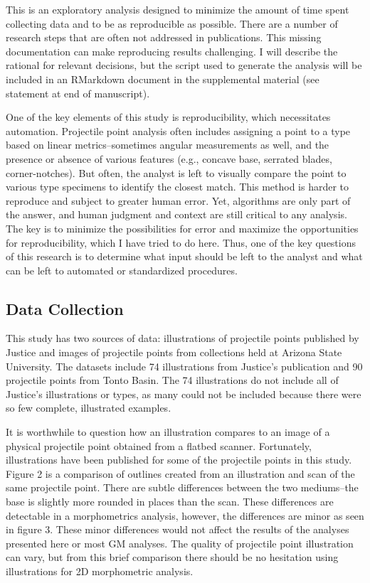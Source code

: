 \documentclass[a4paper]{article}
\begin{document}
This is an exploratory analysis designed to minimize the amount of time spent collecting data and to be as reproducible as possible. There are a number of research steps that are often not addressed in publications. This missing documentation can make reproducing results challenging. I will describe the rational for relevant decisions, but the script used to generate the analysis will be included in an RMarkdown document in the supplemental material (see statement at end of manuscript).

One of the key elements of this study is reproducibility, which necessitates automation. Projectile point analysis often includes assigning a point to a type based on linear metrics--sometimes angular measurements as well, and the presence or absence of various features (e.g., concave base, serrated blades, corner-notches). But often, the analyst is left to visually compare the point to various type specimens to identify the closest match. This method is harder to reproduce and subject to greater human error. Yet, algorithms are only part of the answer, and human judgment and context are still critical to any analysis. The key is to minimize the possibilities for error and maximize the opportunities for reproducibility, which I have tried to do here. Thus, one of the key questions of this research is to determine what input should be left to the analyst and what can be left to automated or standardized procedures.

\hypertarget{data-collection}{%
\subsection*{Data Collection}\label{data-collection}}

This study has two sources of data: illustrations of projectile points published by Justice \autocite*{Justice2002-cf} and images of projectile points from collections held at Arizona State University. The datasets include 74 illustrations from Justice's publication and 90 projectile points from Tonto Basin. The 74 illustrations do not include all of Justice's illustrations or types, as many could not be included because there were so few complete, illustrated examples.

It is worthwhile to question how an illustration compares to an image of a physical projectile point obtained from a flatbed scanner. Fortunately, illustrations have been published for some of the projectile points in this study. Figure 2 is a comparison of outlines created from an illustration and scan of the same projectile point. There are subtle differences between the two mediums--the base is slightly more rounded in places than the scan. These differences are detectable in a morphometrics analysis, however, the differences are minor as seen in figure 3. These minor differences would not affect the results of the analyses presented here or most GM analyses. The quality of projectile point illustration can vary, but from this brief comparison there should be no hesitation using illustrations for 2D morphometric analysis.
\end{document}

